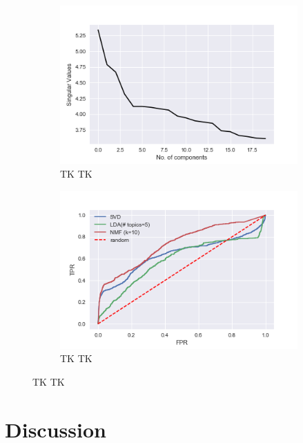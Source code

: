\documentclass{article} %
\begin{document}
\begin{figure}
\centering
\begin{subfigure}{.5\textwidth}
    \centering
    \includegraphics[width=1\linewidth]{figures/singular_values_log_yscale}
    \caption{\small TK TK}
    \label{fig:svd}
\end{subfigure}%
\begin{subfigure}{.5\textwidth}
    \centering
    \includegraphics[width=1\linewidth]{figures/roc}
    \caption{\small TK TK}
    \label{fig:roc}
\end{subfigure}
\caption{\small TK TK}
\label{fig:test}
\end{figure}

\section{Discussion}
\end{document}
